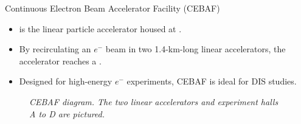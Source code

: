 \begin{frame}{Continuous Electron Beam Accelerator Facility (CEBAF)}
    \label{10.31::cebaf}

    \begin{itemize}
        \item
             is the linear particle accelerator housed at .

        \item
            By recirculating an $e^-$ beam in two 1.4-km-long linear accelerators, the accelerator reaches a .

        \item
            Designed for high-energy $e^-$ experiments, CEBAF is ideal for DIS studies.
    \end{itemize}

    \begin{center}
        \begin{figure}[t]

            \scriptsize{\textit{
                CEBAF diagram.
                The two linear accelerators and experiment halls A to D are pictured.
            }}
        \end{figure}
    \end{center}
\end{frame}

